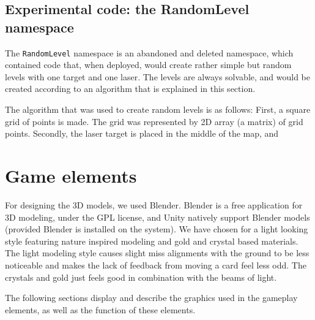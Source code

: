 		\subsection{Experimental code: the RandomLevel namespace} \label{ssec:randomlevelnamespace}
			The \texttt{RandomLevel} namespace is an abandoned and deleted
			namespace, which contained code that, when deployed, would create
			rather simple but random levels with one target and one laser.
			The levels are always solvable, and would be created according 
			to an algorithm that is explained in this section.
			
			The algorithm that was used to create random levels is as follows:
			First, a square grid of points is made. The grid was represented by
			2D array (a matrix) of grid points. Secondly, the laser target is
			placed in the middle of the map, and 

	\section{Game elements} \label{sec:graphicaldesign}
		For designing the 3D models, we used Blender. Blender is a free application
		for 3D modeling, under the GPL license, and Unity natively support Blender 
		models (provided Blender is installed on the system). We have chosen for a 
		light looking style featuring nature inspired modeling and gold and crystal 
		based materials. The light modeling style causes slight miss alignments with 
		the ground to be less noticeable and makes the lack of feedback from moving a 
		card feel less odd. The crystals and gold just feels good in combination with 
		the beams of light.
		
		The following sections display and describe the graphics used in
		the gameplay elements, as well as the function of
		these elements.
		
